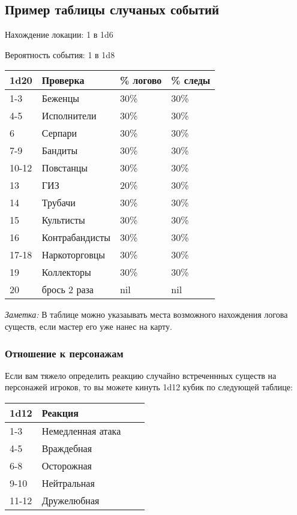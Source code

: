 \subsection*{Пример таблицы случаных событий}

Нахождение локации: 1 в 1d6

Вероятность события: 1 в 1d8

\begin{table}[H]
  \centering
  \begin{tabular}{*4{l}}
    \toprule
    1d20 & Проверка & \% логово & \% следы \\
    \midrule
    1-3   & Беженцы        & 30\% & 30\% \\
    4-5   & Исполнители    & 30\% & 30\% \\
    6     & Серпари        & 30\% & 30\% \\
    7-9   & Бандиты        & 30\% & 30\% \\
    10-12 & Повстанцы      & 30\% & 30\% \\
    13    & ГИЗ            & 20\% & 30\% \\
    14    & Трубачи        & 30\% & 30\% \\
    15    & Культисты      & 30\% & 30\% \\
    16    & Контрабандисты & 30\% & 30\% \\
    17-18 & Наркоторговцы  & 30\% & 30\% \\
    19    & Коллекторы     & 30\% & 30\% \\
    20    & брось 2 раза   & nil & nil \\
    \bottomrule
  \end{tabular}
\end{table}

\textit{Заметка:} В таблице можно указаывать места возможного нахождения логова существ,
если мастер его уже нанес на карту.

\subsubsection*{Отношение к персонажам}

Если вам тяжело определить реакцию случайно встреченнных существ
на персонажей игроков, то вы можете кинуть 1d12 кубик по следующей таблице:

\begin{table}[H]
  \centering
  \begin{tabular}{*4{l}}
    \toprule
    1d12 & Реакция \\
    \midrule
    1-3   & Немедленная атака\\
    4-5   & Враждебная\\
    6-8   & Осторожная\\
    9-10  & Нейтральная\\
    11-12 & Дружелюбная\\
    \bottomrule
  \end{tabular}
\end{table}